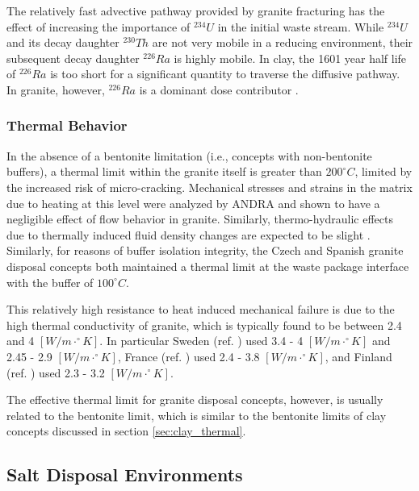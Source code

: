 The relatively fast advective pathway provided by granite fracturing
has the effect of increasing the importance of $^{234}U$ in the initial waste 
stream. While $^{234}U$ and its decay daughter $^{230}Th$ are not very mobile 
in a reducing environment, their subsequent decay daughter $^{226}Ra$ is highly 
mobile. In clay, the 1601 year half life of $^{226}Ra$ is too short for a 
significant quantity to traverse the diffusive pathway. In granite, however,  
$^{226}Ra$ is a dominant dose contributor \cite{swift_applying_2010}. 

\subsubsection{Thermal Behavior}
\label{subsec:granitethermal}
In the absence of a bentonite limitation (i.e., concepts with non-bentonite 
buffers), a thermal limit within the granite itself is greater than 
$200^{\circ}C$, limited by the increased risk of micro-cracking.
Mechanical stresses and strains in the matrix due to heating at this 
level were analyzed by \gls{ANDRA} and shown to have a negligible effect of 
flow behavior in granite. Similarly, thermo-hydraulic effects due to thermally
induced fluid density changes are expected to be slight 
\cite{andra_granite:_2005}.
Similarly, for reasons of buffer isolation integrity, the Czech and Spanish
granite disposal concepts both maintained a thermal limit at the waste package
interface with the buffer of $100^{\circ}C$.  \cite{von_lensa_red-impact_2008}

This relatively high resistance to heat  induced mechanical failure is due to the 
high thermal conductivity of granite, which is typically found to be between 
2.4 and 4 $[W/m\cdot^{\circ}K]$.  In particular Sweden (ref. 
\cite{ab_long-term_2006}) used 3.4 - 4 $[W/m\cdot^{\circ}K]$ and 2.45 - 2.9 
$[W/m\cdot^{\circ}K]$,  France (ref.  \cite{andra_argile:_2005}) used 2.4 - 3.8 
$[W/m\cdot^{\circ}K]$, and  Finland (ref. \cite{posiva_interim_2010}) used 2.3 
- 3.2 $[W/m\cdot^{\circ}K]$. 

The effective thermal limit for granite disposal concepts, however, is usually 
related to the bentonite limit, which is similar to the bentonite limits of clay 
concepts discussed in section \ref{sec:clay_thermal}.

\subsection{Salt Disposal Environments}

